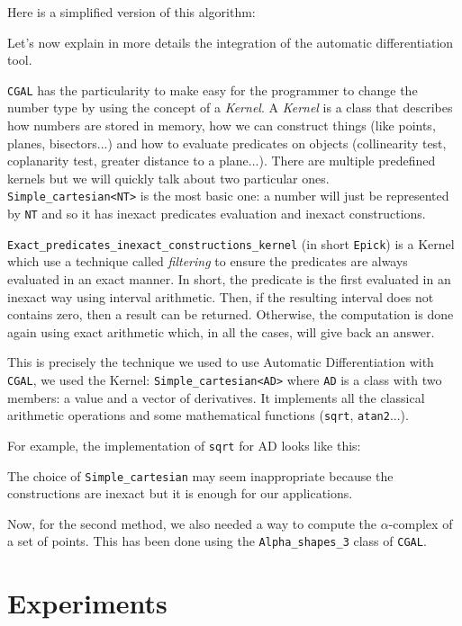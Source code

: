 Here is a simplified version of this algorithm:


Let's now explain in more details the integration of the automatic
differentiation tool.

\texttt{CGAL} has the particularity to make easy for the programmer to change
the number type by using the concept of a \emph{Kernel}. A \emph{Kernel} is a
class that describes how numbers are stored in memory, how we can construct
things (like points, planes, bisectors...) and how to evaluate predicates on
objects (collinearity test, coplanarity test, greater distance to a plane...).
There are multiple predefined kernels but we will quickly talk about two
particular ones. \texttt{Simple\_cartesian<NT>} is the most basic one: a number
will just be represented by \texttt{NT} and so it has inexact predicates
evaluation and inexact constructions.

\texttt{Exact\_predicates\_inexact\_constructions\_kernel} (in short
\texttt{Epick}) is a Kernel which use a technique called \emph{filtering} to
ensure the predicates are always evaluated in an exact manner. In short, the
predicate is the first evaluated in an inexact way using interval arithmetic.
Then, if the resulting interval does not contains zero, then a result can be
returned. Otherwise, the computation is done again using exact arithmetic which,
in all the cases, will give back an answer.

This is precisely the technique we used to use Automatic Differentiation with
\texttt{CGAL}, we used the Kernel: \texttt{Simple\_cartesian<AD>} where
\texttt{AD} is a class with two members: a value and a vector of derivatives.
It implements all the classical arithmetic operations and some mathematical
functions (\texttt{sqrt}, \texttt{atan2}...).

For example, the implementation of \texttt{sqrt} for AD looks like this:


The choice of \texttt{Simple\_cartesian} may seem inappropriate because the
constructions are inexact but it is enough for our applications.

Now, for the second method, we also needed a way to compute the $\alpha$-complex
of a set of points. This has been done using the \texttt{Alpha\_shapes\_3} class
of \texttt{CGAL}.


\section{Experiments}

